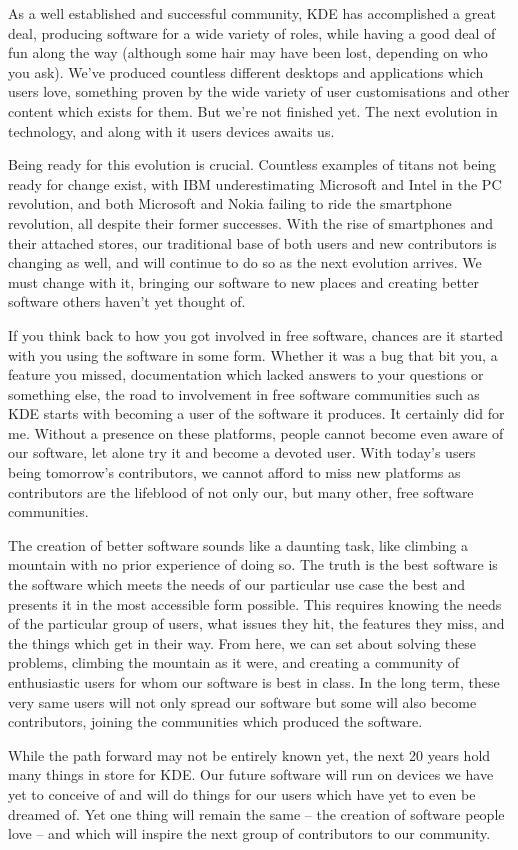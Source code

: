 

\noindent{}As a well established and successful community, KDE has accomplished a great deal, producing software for a wide variety of roles, while having a good deal of fun along the way (although some hair may have been lost, depending on who you ask). We've produced countless different desktops and applications which users love, something proven by the wide variety of user customisations and other content which exists for them. But we're not finished yet. The next evolution in technology, and along with it users devices awaits us.

Being ready for this evolution is crucial. Countless examples of titans not being ready for change exist, with IBM underestimating Microsoft and Intel in the PC revolution, and both Microsoft and Nokia failing to ride the smartphone revolution, all despite their former successes. With the rise of smartphones and their attached stores, our traditional base of both users and new contributors is changing as well, and will continue to do so as the next evolution arrives. We must change with it, bringing our software to new places and creating better software others haven't yet thought of.

If you think back to how you got involved in free software, chances are it started with you using the software in some form. Whether it was a bug that bit you, a feature you missed, documentation which lacked answers to your questions or something else, the road to involvement in free software communities such as KDE starts with becoming a user of the software it produces. It certainly did for me. Without a presence on these platforms, people cannot become even aware of our software, let alone try it and become a devoted user. With today's users being tomorrow's contributors, we cannot afford to miss new platforms  as contributors are the lifeblood of not only our, but many other, free software communities.

The creation of better software sounds like a daunting task, like climbing a mountain with no prior experience of doing so. The truth is the best software is the software which meets the needs of our particular use case the best and presents it in the most accessible form possible. This requires knowing the needs of the particular group of users, what issues they hit, the features they miss, and the things which get in their way. From here, we can set about solving these problems, climbing the mountain as it were, and creating a community of enthusiastic users for whom our software is best in class. In the long term, these very same users will not only spread our software but some will also become contributors, joining the communities which produced the software.

While the path forward may not be entirely known yet, the next 20 years hold many things in store for KDE. Our future software will run on devices we have yet to conceive of and will do things for our users which have yet to even be dreamed of. Yet one thing will remain the same – the creation of software people love – and which will inspire the next group of contributors to our community.